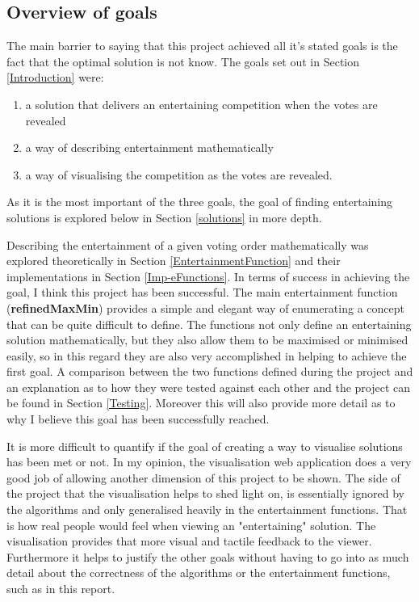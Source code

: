 \documentclass[12pt]{report}
\begin{document}
\subsection{Overview of goals}
The main barrier to saying that this project achieved all it's stated goals is the fact that the optimal solution is not know. The goals set out in Section \ref{Introduction} were:
\begin{enumerate}
\item a solution that delivers an entertaining competition when the votes are revealed
\item a way of describing entertainment mathematically
\item a way of visualising the competition as the votes are revealed.
\end{enumerate}

As it is the most important of the three goals, the goal of finding entertaining solutions is explored below in Section \ref{solutions} in more depth.

Describing the entertainment of a given voting order mathematically was explored theoretically in Section \ref{EntertainmentFunction} and their implementations in Section \ref{Imp-eFunctions}. In terms of success in achieving the goal, I think this project has been successful. The main entertainment function (\textbf{refinedMaxMin}) provides a simple and elegant way of enumerating a concept that can be quite difficult to define. The functions not only define an entertaining solution mathematically, but they also allow them to be maximised or minimised easily, so in this regard they are also very accomplished in helping to achieve the first goal. A comparison between the two functions defined during the project and an explanation as to how they were tested against each other and the project can be found in Section \ref{Testing}. Moreover this will also provide more detail as to why I believe this goal has been successfully reached.

It is more difficult to quantify if the goal of creating a way to visualise solutions has been met or not. In my opinion, the visualisation web application does a very good job of allowing another dimension of this project to be shown. The side of the project that the visualisation helps to shed light on, is essentially ignored by the algorithms and only generalised heavily in the entertainment functions. That is how real people would feel when viewing an "entertaining" solution. The visualisation provides that more visual and tactile feedback to the viewer. Furthermore it helps to justify the other goals without having to go into as much detail about the correctness of the algorithms or the entertainment functions, such as in this report.
\end{document}
